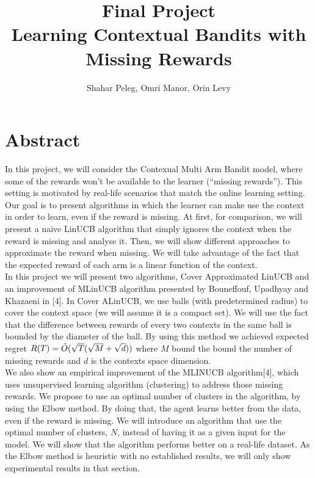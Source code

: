 \documentclass{article}
\title{Final Project\\
Learning Contextual Bandits with Missing Rewards}
\author{Shahar Peleg, Omri Manor, Orin Levy }
\affil{\href{mailto:shaharpeleg@mail.tau.ac.il}{shaharpeleg@mail.tau.ac.il}, \href{mailto:omrimanor@mail.tau.ac.il}{omrimanor@mail.tau.ac.il}, \href{mailto:orinlevy@mail.tau.ac.il}{orinlevy@mail.tau.ac.il}}
\begin{document}
\maketitle

\section{Abstract}

In this project, we will consider the Contexual Multi Arm Bandit model, where some of the rewards won't be available to the learner (“missing rewards”). This setting is motivated by real-life scenarios that match the online learning setting.\\


Our goal is to present algorithms in which the learner can make use the context in order to learn, even if the reward is missing. At first, for comparison, we will present a naive LinUCB algorithm that simply ignores the context when the reward is missing and analyse it. Then, we will show different approaches to approximate the reward when missing. We will take advantage of the fact that the expected reward of each arm is a linear function of the context.\\

In this project we will present two algorithms, Cover Approximated LinUCB and an improvement of MLinUCB algorithm presented by Bouneffouf, Upadhyay and Khazaeni in [4]. In Cover ALinUCB, we use balls (with predetermined radius) to cover the context space (we will assume it is a compact set). We will use the fact that the difference between rewards of every two contexts in the same ball is bounded by the diameter of the ball. By using this method we achieved expected regret $R(T) = \Tilde{O}(\sqrt{T}(\sqrt{M} + \sqrt{d}))$ where $M$ bound the bound the number of missing rewards and $d$ is the contexts space dimension. \\

We also show an empirical improvement of the MLINUCB algorithm[4], which uses unsupervised learning  algorithm (clustering) to address those missing rewards. We propose to use an optimal number of clusters in the algorithm, by using the Elbow method. By doing that, the agent learns better from the data, even if the reward is missing. We will introduce an algorithm that use the optimal number of clusters, $N$, instead of having it as a given input for the model. We will show that the algorithm performs better on a real-life dataset. As the Elbow method is heuristic with no established results, we will only show experimental results in that section. 
\end{document}
